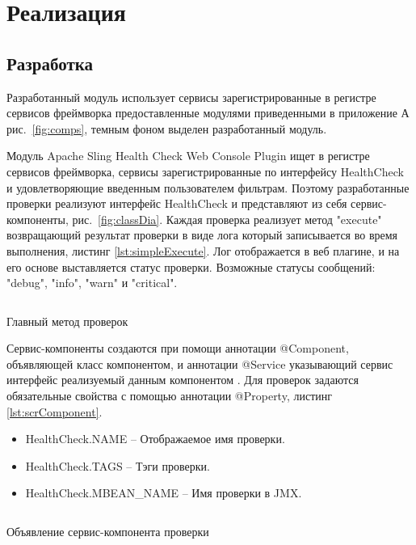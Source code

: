 \chapter{Реализация}
\label{cha:impl}

\section{Разработка}

Разработанный модуль использует сервисы зарегистрированные в регистре сервисов фреймворка предоставленные модулями приведенными в приложение А рис.~\ref{fig:comps}, темным фоном выделен разработанный модуль.

Модуль Apache Sling Health Check Web Console Plugin ищет в регистре сервисов фреймворка, сервисы зарегистрированные по интерфейсу HealthCheck и удовлетворяющие введенным пользователем фильтрам. Поэтому разработанные проверки реализуют интерфейс HealthCheck и представляют из себя сервис-компоненты, рис.~\ref{fig:classDia}. Каждая проверка реализует метод "execute" возвращающий результат проверки в виде лога который записывается во время выполнения, листинг \ref{lst:simpleExecute}. Лог отображается в веб плагине, и на его основе выставляется статус проверки. Возможные статусы сообщений: "debug", "info", "warn" и "critical".

\begin{listing}[H]
\inputminted[linenos,frame=single]{java}{inc/src/simpleExecute}
\caption{Главный метод проверок} 
\label{lst:simpleExecute}
\end{listing}

Сервис-компоненты создаются при помощи аннотации @Component, объявляющей класс компонентом, и аннотации @Service указывающий сервис интерфейс реализуемый данным компонентом \cite{web:felixScr}. Для проверок задаются обязательные свойства с помощью аннотации @Property, листинг \ref{lst:scrComponent}.
\begin{itemize}
\item HealthCheck.NAME – Отображаемое имя проверки.
\item HealthCheck.TAGS – Тэги проверки.
\item HealthCheck.MBEAN\_NAME – Имя проверки в JMX.
\end{itemize}

\begin{listing}[H]
\inputminted[linenos,frame=single]{java}{inc/src/scrComponent}
\caption{Объявление сервис-компонента проверки} 
\label{lst:scrComponent}
\end{listing}

